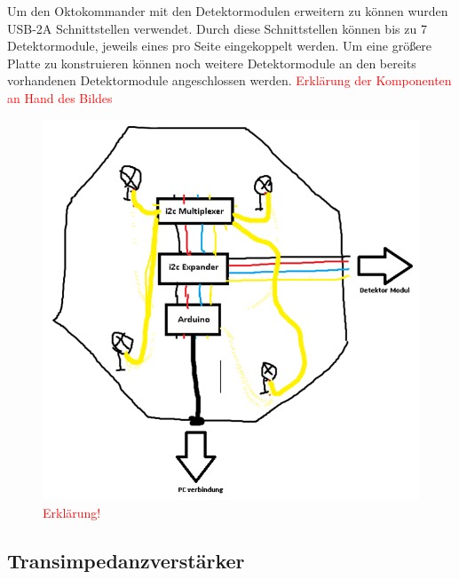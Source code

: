 Um den Oktokommander mit den Detektormodulen erweitern zu können wurden USB-2A Schnittstellen verwendet. Durch diese Schnittstellen können bis zu 7 Detektormodule, jeweils eines pro Seite  eingekoppelt werden. Um eine größere Platte zu konstruieren können noch weitere Detektormodule an den bereits vorhandenen Detektormodule angeschlossen werden.
\textcolor{red}{Erklärung der Komponenten an Hand des Bildes}

\begin{figure}[h]
	\centering
	\includegraphics[scale=0.8]{../figures/PrinzipskizzeOktokommander.png} 
	\caption{\textcolor{red}{Erklärung!}}
	\label{fig:PrinzipskizzeOktokommander}
\end{figure}


\subsection{Transimpedanzverstärker}
\label{subsec:Transimpedanzverstärker}

